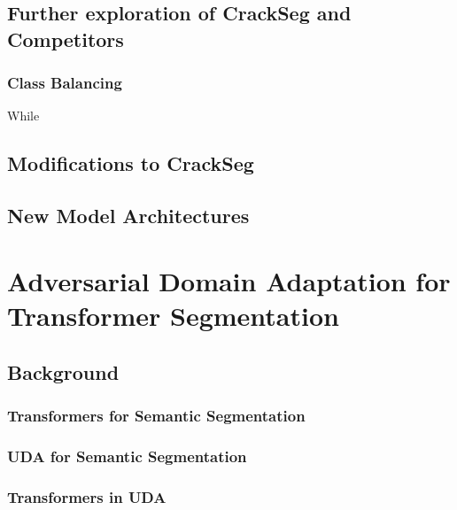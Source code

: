 \documentclass[a4paper,12pt]{report}
\begin{document}
    \section{Further exploration of CrackSeg and Competitors} %
    \subsection{Class Balancing}
    While 


\section{Modifications to CrackSeg}

\section{New Model Architectures}

\chapter{Adversarial Domain Adaptation for Transformer Segmentation}

\section{Background}

    \subsection*{Transformers for Semantic Segmentation}

    \subsection*{UDA for Semantic Segmentation}

    \subsection*{Transformers in UDA}
\end{document}
